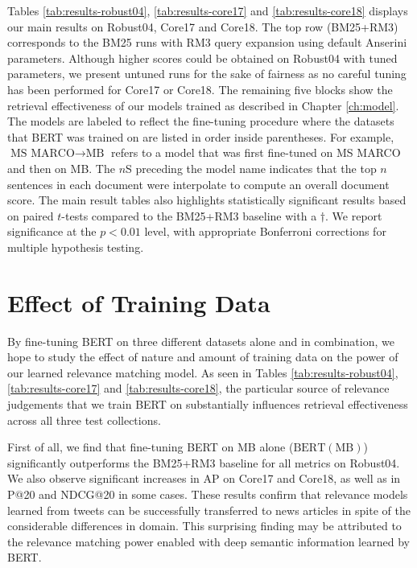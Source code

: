 Tables \ref{tab:results-robust04}, \ref{tab:results-core17} and \ref{tab:results-core18} displays our main results on Robust04, Core17 and Core18.
The top row (BM25+RM3) corresponds to the BM25 runs with RM3 query expansion using default Anserini parameters.
Although higher scores could be obtained on Robust04 with tuned parameters, we present untuned runs for the sake of fairness as no careful tuning has been performed for Core17 or Core18.
The remaining five blocks show the retrieval effectiveness of our models trained as described in Chapter \ref{ch:model}.
The models are labeled to reflect the fine-tuning procedure where the datasets that BERT was trained on are listed in order inside parentheses.
For example, $\textrm{MS MARCO}\rightarrow\textrm{MB}$ refers to a model that was first fine-tuned on MS MARCO and then on MB.
The $ n $S preceding the model name indicates that the top $ n $ sentences in each document were interpolate to compute an overall document score.
The main result tables also highlights statistically significant results based on paired $ t $-tests compared to the BM25+RM3 baseline with a $ {\dagger} $.
We report significance at the $ p < 0.0 1 $ level, with appropriate Bonferroni corrections for multiple hypothesis testing.

\section{Effect of Training Data}

By fine-tuning BERT on three different datasets alone and in combination, we hope to study the effect of nature and amount of training data on the power of our learned relevance matching model.
As seen in Tables \ref{tab:results-robust04}, \ref{tab:results-core17} and \ref{tab:results-core18}, the particular source of relevance judgements that we train BERT on substantially influences retrieval effectiveness across all three test collections.

First of all, we find that fine-tuning BERT on MB alone ($ \textrm{BERT}(\textrm{MB}) $) significantly outperforms the BM25+RM3 baseline for all metrics on Robust04.
We also observe significant increases in AP on Core17 and Core18, as well as in P@20 and NDCG@20 in some cases.
These results confirm that relevance models learned from tweets can be successfully transferred to news articles in spite of the considerable differences in domain.
This surprising finding may be attributed to the relevance matching power enabled with deep semantic information learned by BERT.

